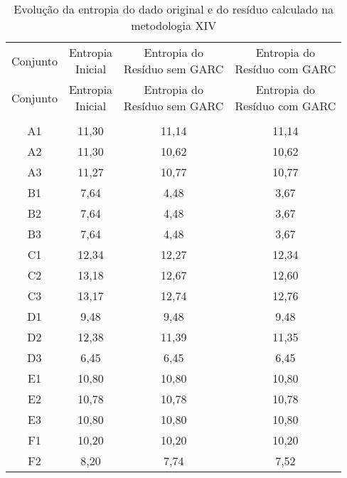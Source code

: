 \begin{center}
\begin{longtable}{cccc}
\toprule
\rowcolor{white}
\caption[Metodologia XIV: evolução da entropia]{Evolução da entropia do dado
original e do resíduo calculado na metodologia XIV}
\label{tab:EvolucaoEntropiaMet14}\\
\midrule
Conjunto & \specialcell{Entropia \\Inicial} & \specialcell{Entropia do
\\Resíduo sem GARC} & \specialcell{Entropia do
\\Resíduo com GARC}  \\
\midrule
\endfirsthead
\midrule
\rowcolor{white}
Conjunto & \specialcell{Entropia \\Inicial} & \specialcell{Entropia do
\\Resíduo sem GARC} & \specialcell{Entropia do
\\Resíduo com GARC}  \\
\toprule
\endhead
\midrule \\ %
\endfoot
\bottomrule 
\endlastfoot
    A1    & 11,30 & 11,14 & 11,14 \\
    A2    & 11,30 & 10,62 & 10,62 \\
    A3    & 11,27 & 10,77 & 10,77 \\
    B1    & 7,64  & 4,48  & 3,67 \\
    B2    & 7,64  & 4,48  & 3,67 \\
    B3    & 7,64  & 4,48  & 3,67 \\
    C1    & 12,34 & 12,27 & 12,34 \\
    C2    & 13,18 & 12,67 & 12,60 \\
    C3    & 13,17 & 12,74 & 12,76 \\
    D1    & 9,48  & 9,48  & 9,48 \\
    D2    & 12,38 & 11,39 & 11,35 \\
    D3    & 6,45  & 6,45  & 6,45 \\
    E1    & 10,80 & 10,80 & 10,80 \\
    E2    & 10,78 & 10,78 & 10,78 \\
    E3    & 10,80 & 10,80 & 10,80 \\
    F1    & 10,20 & 10,20 & 10,20 \\
    F2    & 8,20  & 7,74  & 7,52 \\

\end{longtable}
\end{center}
